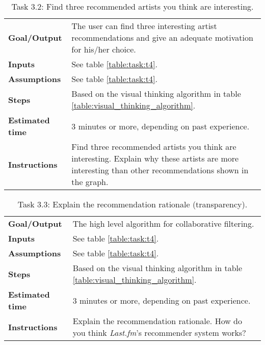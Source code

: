 \begin{table}
	\caption{Task 3.2: Find three recommended artists you think are interesting.}
	\begin{tabular}{ p{80px} | p{350px} }
		\hline
		\textbf{Goal/Output}			& The user can find three interesting artist recommendations and give an adequate motivation for his/her choice. \\
		\textbf{Inputs}						& See table \ref{table:task:t4}. \\
		\textbf{Assumptions}			& See table \ref{table:task:t4}. \\
		\textbf{Steps}						& Based on the visual thinking algorithm in table \ref{table:visual_thinking_algorithm}. \\
		\textbf{Estimated time} 	& $3$ minutes or more, depending on past experience. \\
		\textbf{Instructions}			&
		Find three recommended artists you think are interesting. Explain why these artists are more interesting than other recommendations shown in the graph.
		\\
		\hline
	\end{tabular}
	\label{table:task:t8}
\end{table}


\begin{table}
	\caption{Task 3.3: Explain the recommendation rationale (transparency).}
	\begin{tabular}{ p{80px} | p{350px} }
		\hline
		\textbf{Goal/Output}			& The high level algorithm for collaborative filtering. \\
		\textbf{Inputs}						& See table \ref{table:task:t4}. \\
		\textbf{Assumptions}			& See table \ref{table:task:t4}. \\
		\textbf{Steps}						& Based on the visual thinking algorithm in table \ref{table:visual_thinking_algorithm}. \\
		\textbf{Estimated time} 	& $3$ minutes or more, depending on past experience. \\
		\textbf{Instructions}			&
		Explain the recommendation rationale. How do you think \emph{Last.fm}'s recommender system works?
		\\
		\hline
	\end{tabular}
	\label{table:task:t9}
\end{table}


